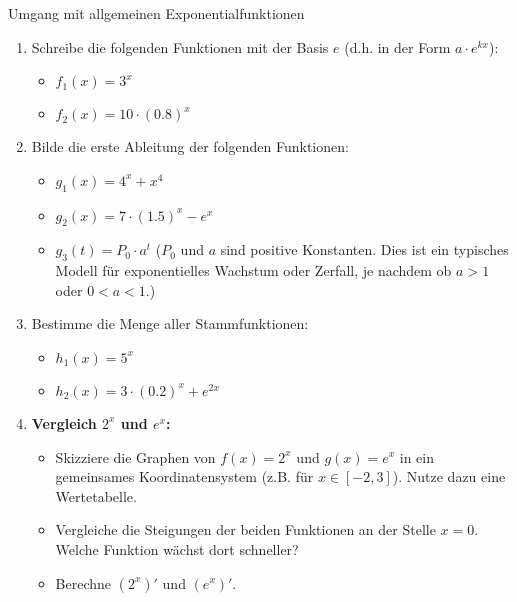 \begin{aufgabenumgebung}{Umgang mit allgemeinen Exponentialfunktionen}
\begin{enumerate}
    \item Schreibe die folgenden Funktionen mit der Basis $e$ (d.h. in der Form $a \cdot e^{kx}$):
        \begin{itemize}
            \item $f_1(x) = 3^x$
            \item $f_2(x) = 10 \cdot (0.8)^x$
        \end{itemize}
    \item Bilde die erste Ableitung der folgenden Funktionen:
        \begin{itemize}
            \item $g_1(x) = 4^x + x^4$
            \item $g_2(x) = 7 \cdot (1.5)^x - e^x$
            \item $g_3(t) = P_0 \cdot a^t$ ($P_0$ und $a$ sind positive Konstanten. Dies ist ein typisches Modell für exponentielles Wachstum oder Zerfall, je nachdem ob $a>1$ oder $0<a<1$.)
        \end{itemize}
    \item Bestimme die Menge aller Stammfunktionen:
        \begin{itemize}
            \item $h_1(x) = 5^x$
            \item $h_2(x) = 3 \cdot (0.2)^x + e^{2x}$
        \end{itemize}
    \item \textbf{Vergleich $2^x$ und $e^x$:}
        \begin{itemize}
            \item Skizziere die Graphen von $f(x)=2^x$ und $g(x)=e^x$ in ein gemeinsames Koordinatensystem (z.B. für $x \in [-2, 3]$). Nutze dazu eine Wertetabelle.
            \item Vergleiche die Steigungen der beiden Funktionen an der Stelle $x=0$. Welche Funktion wächst dort schneller?
            \item Berechne $(2^x)'$ und $(e^x)'$.
        \end{itemize}
\end{enumerate}
\end{aufgabenumgebung}

